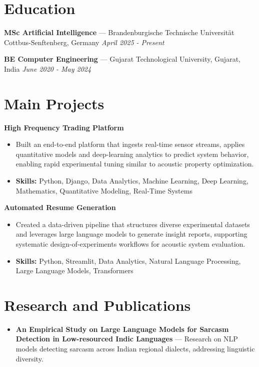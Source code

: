 \documentclass[a4paper,10pt]{article}
\begin{document}
\section*{Education}
\textbf{MSc Artificial Intelligence} — Brandenburgische Technische Universität Cottbus-Senftenberg, Germany \hfill \textit{April 2025 - Present}\par
\vspace{1.5pt}
\textbf{BE Computer Engineering} — Gujarat Technological University, Gujarat, India \hfill \textit{June 2020 - May 2024}\par

\section*{Main Projects}
\textbf{High Frequency Trading Platform}\par
\vspace{1pt}
\begin{itemize}
  \item Built an end-to-end platform that ingests real-time sensor streams, applies quantitative models and deep-learning analytics to predict system behavior, enabling rapid experimental tuning similar to acoustic property optimization.
  \item \textbf{Skills:} Python, Django, Data Analytics, Machine Learning, Deep Learning, Mathematics, Quantitative Modeling, Real-Time Systems
\end{itemize}
\vspace{3pt}
\textbf{Automated Resume Generation}\par
\vspace{1pt}
\begin{itemize}
  \item Created a data-driven pipeline that structures diverse experimental datasets and leverages large language models to generate insight reports, supporting systematic design-of-experiments workflows for acoustic system evaluation.
  \item \textbf{Skills:} Python, Streamlit, Data Analytics, Natural Language Processing, Large Language Models, Transformers
\end{itemize}

\section*{Research and Publications}
\begin{itemize}
\item \textbf{An Empirical Study on Large Language Models for Sarcasm Detection in Low-resourced Indic Languages} — Research on NLP models detecting sarcasm across Indian regional dialects, addressing linguistic diversity.
\end{itemize}
\end{document}
